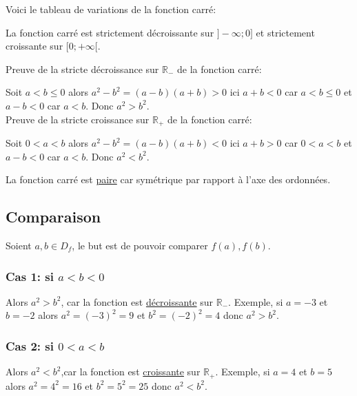 \documentclass[french]{book}
\begin{document}
Voici le tableau de variations de la fonction carré:



\begin{center}
\end{center}



\begin{prop}
La fonction carré est strictement décroissante sur $]-\infty;0]$ et strictement croissante sur $[0;+\infty[$.
\end{prop}

\begin{demo}

Preuve de la stricte décroissance sur $\mathbb{R}_-$ de la fonction carré:


Soit $a<b \leq 0$ alors $a^2 - b^2 =(a-b)(a+b) > 0 $ ici $a+b < 0$ car $a<b \leq 0$ et $a-b <0$ car $a<b$. Donc $a^2>b^2$.\\

Preuve de la stricte croissance sur $\mathbb{R}_+$ de la fonction carré:

Soit $0<a<b$ alors $a^2 - b^2 =(a-b)(a+b) < 0 $ ici $a+b > 0$ car $0<a<b$ et $a-b <0$ car $a<b$. Donc $a^2<b^2$.

\end{demo}


\begin{prop}
La fonction carré est \underline{paire} car symétrique par rapport à l'axe des ordonnées.
\end{prop}

\subsection*{Comparaison}
Soient $a,b \in D_f$, le but est de pouvoir comparer $f(a),f(b)$.
\subsubsection*{Cas 1: si $a<b<0$}
Alors $a^2>b^2$, car la fonction est \underline{décroissante} sur $\mathbb{R}_-$. Exemple, si $a=-3$ et $b=-2$ alors $a^2=(-3)^2=9$ et $b^2=(-2)^2=4$ donc $a^2 > b^2$.
\subsubsection*{Cas 2: si  $0<a<b$}
Alors $a^2<b^2$,car la fonction est \underline{croissante} sur $\mathbb{R}_+$. Exemple, si $a=4$ et $b=5$ alors $a^2=4^2=16$ et $b^2=5^2=25$ donc $a^2 < b^2$.
\end{document}
